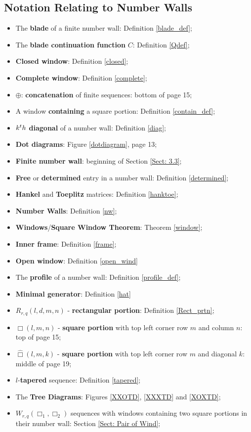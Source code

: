 \documentclass{article}
\theoremstyle{definition}
\newcommand{\nth}{\textup{th}}
\numberwithin{equation}{subsection}
\begin{document}
\subsection*{Notation Relating to Number Walls}
\begin{itemize}
    \item The \textbf{blade} of a finite number wall: Definition \ref{blade_def};
    \item The \textbf{blade continuation function} $C$: Definition \ref{Qdef};
    \item \textbf{Closed window}: Definition \ref{closed};
    \item \textbf{Complete window}: Definition \ref{complete};
    \item $\oplus$: \textbf{concatenation} of finite sequences: bottom of page 15;
    \item A window \textbf{containing} a square portion: Definition \ref{contain_def};
    \item $k^\nth$ \textbf{diagonal} of a number wall: Definition \ref{diag};
    \item \textbf{Dot diagrams}: Figure \ref{dotdiagram}, page 13;
    \item \textbf{Finite number wall}: beginning of Section \ref{Sect: 3.3};
    \item \textbf{Free} or \textbf{determined} entry in a number wall: Definition \ref{determined};
    \item \textbf{Hankel} and \textbf{Toeplitz} matrices: Definition \ref{hanktoe};
    \item \textbf{Number Walls}: Definition \ref{nw};
    \item \textbf{Windows}/\textbf{Square Window Theorem}: Theorem \ref{window};
    \item \textbf{Inner frame}: Definition \ref{frame};
    \item \textbf{Open window}: Definition \ref{open_wind}
    \item The \textbf{profile} of a number wall: Definition \ref{profile_def};
    \item \textbf{Minimal generator}: Definition \ref{hat}
    \item $R_{r,q}(l,d,m,n)$ - \textbf{rectangular portion}: Definition \ref{Rect_prtn};
    \item $\Box(l,m,n)$ - \textbf{square portion} with top left corner row $m$ and column $n$: top of page 15;
    \item $\widehat\Box(l,m,k)$ - \textbf{square portion} with top left corner row $m$ and diagonal $k$: middle of page 19;
    \item $l$-\textbf{tapered} sequence: Definition \ref{tapered};
    \item The \textbf{Tree Diagrams}: Figures \ref{XXOTD}, \ref{XXXTD} and \ref{XOXTD};
    \item $W_{r,q}(\Box_1,\Box_2)$ sequences with windows containing two square portions in their number wall: Section \ref{Sect: Pair of Wind};

\end{itemize}
\end{document}
